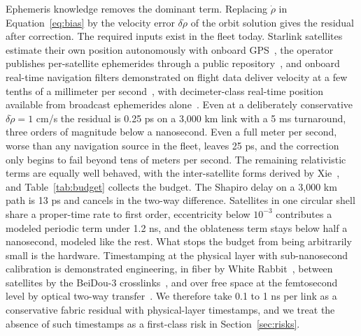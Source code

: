 \documentclass[twocolumn,10pt]{article}
\begin{document}
Ephemeris knowledge removes the dominant term. Replacing $\dot\rho$ in Equation~\ref{eq:bias} by the velocity error $\delta\dot\rho$ of the orbit solution gives the residual after correction. The required inputs exist in the fleet today. Starlink satellites estimate their own position autonomously with onboard GPS~\cite{fccgen2}, the operator publishes per-satellite ephemerides through a public repository~\cite{celestrak}, and onboard real-time navigation filters demonstrated on flight data deliver velocity at a few tenths of a millimeter per second~\cite{pod}, with decimeter-class real-time position available from broadcast ephemerides alone~\cite{hauschild2021}. Even at a deliberately conservative $\delta\dot\rho = 1$ cm/s the residual is 0.25 ps on a 3{,}000 km link with a 5 ms turnaround, three orders of magnitude below a nanosecond. Even a full meter per second, worse than any navigation source in the fleet, leaves 25 ps, and the correction only begins to fail beyond tens of meters per second. The remaining relativistic terms are equally well behaved, with the inter-satellite forms derived by Xie~\cite{xie2016}, and Table~\ref{tab:budget} collects the budget. The Shapiro delay on a 3{,}000 km path is 13 ps and cancels in the two-way difference. Satellites in one circular shell share a proper-time rate to first order, eccentricity below $10^{-3}$ contributes a modeled periodic term under 1.2 ns, and the oblateness term stays below half a nanosecond, modeled like the rest. What stops the budget from being arbitrarily small is the hardware. Timestamping at the physical layer with sub-nanosecond calibration is demonstrated engineering, in fiber by White Rabbit~\cite{whiterabbit}, between satellites by the BeiDou-3 crosslinks~\cite{li2025}, and over free space at the femtosecond level by optical two-way transfer~\cite{deschenes2016}. We therefore take 0.1 to 1 ns per link as a conservative fabric residual with physical-layer timestamps, and we treat the absence of such timestamps as a first-class risk in Section~\ref{sec:risks}.
\end{document}
